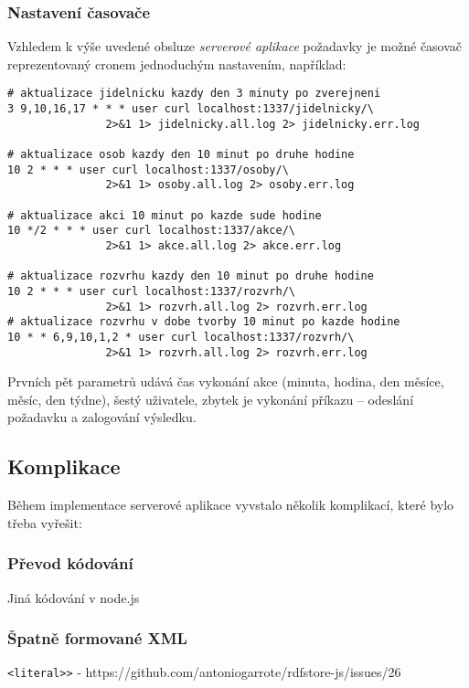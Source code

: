 \subsubsection{Nastavení časovače}
Vzhledem k výše uvedené obsluze \textit{serverové aplikace}  požadavky je možné časovač reprezentovaný cronem jednoduchým nastavením, například:
\begin{verbatim}
# aktualizace jidelnicku kazdy den 3 minuty po zverejneni
3 9,10,16,17 * * * user curl localhost:1337/jidelnicky/\
               2>&1 1> jidelnicky.all.log 2> jidelnicky.err.log

# aktualizace osob kazdy den 10 minut po druhe hodine
10 2 * * * user curl localhost:1337/osoby/\
               2>&1 1> osoby.all.log 2> osoby.err.log

# aktualizace akci 10 minut po kazde sude hodine
10 */2 * * * user curl localhost:1337/akce/\
               2>&1 1> akce.all.log 2> akce.err.log

# aktualizace rozvrhu kazdy den 10 minut po druhe hodine
10 2 * * * user curl localhost:1337/rozvrh/\
               2>&1 1> rozvrh.all.log 2> rozvrh.err.log
# aktualizace rozvrhu v dobe tvorby 10 minut po kazde hodine
10 * * 6,9,10,1,2 * user curl localhost:1337/rozvrh/\
               2>&1 1> rozvrh.all.log 2> rozvrh.err.log
\end{verbatim}
Prvních pět parametrů udává čas vykonání akce (minuta, hodina, den měsíce, měsíc, den týdne), šestý uživatele, zbytek je vykonání příkazu -- odeslání požadavku a zalogování výsledku.


\subsection{Komplikace}
Během implementace serverové aplikace vyvstalo několik komplikací, které bylo třeba vyřešit:

\subsubsection{Převod kódování}
Jiná kódování v node.js

\subsubsection{Špatně formované XML}
\verb|<literal>>| - https://github.com/antoniogarrote/rdfstore-js/issues/26

